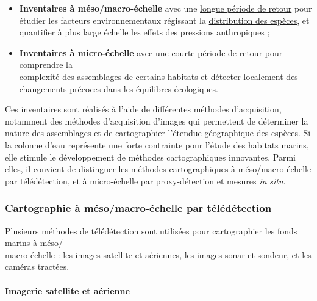 \begin{itemize}
    \item \textbf{Inventaires à méso/macro-échelle} avec une \underline{longue période de retour} pour étudier les facteurs environnementaux régissant la \underline{distribution des espèces}, et quantifier à plus large échelle les effets des pressions anthropiques ;
    
    \item \textbf{Inventaires à micro-échelle} avec une \underline{courte période de retour} pour comprendre la\\ \underline{complexité des assemblages} de certains habitats et détecter localement des changements précoces dans les équilibres écologiques.
\end{itemize}

Ces inventaires sont réalisés à l’aide de différentes méthodes d’acquisition, notamment des méthodes d’acquisition d’images qui permettent de déterminer la nature des assemblages et de cartographier l’étendue géographique des espèces. Si la colonne d’eau représente une forte contrainte pour l’étude des habitats marins, elle stimule le développement de méthodes cartographiques innovantes. Parmi elles, il convient de distinguer les méthodes cartographiques à méso/macro-échelle par télédétection, et à micro-échelle par proxy-détection et mesures \textit{in situ}.

\subsubsection{Cartographie à méso/macro-échelle par télédétection}\label{intro.2.2.1}

Plusieurs méthodes de télédétection sont utilisées pour cartographier les fonds marins à méso/\\macro-échelle : les images satellite et aériennes, les images sonar et sondeur, et les caméras tractées.

\paragraph{Imagerie satellite et aérienne}

